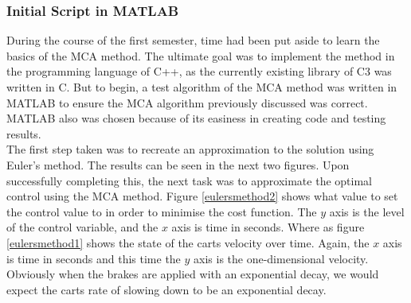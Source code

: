 \documentclass[11pt,draftd]{article}
\begin{document}
\subsubsection{Initial Script in MATLAB}
During the course of the first semester, time had been put aside to learn the basics of the MCA method. The ultimate goal was to implement the method in the programming language of C++, as the currently existing library of C3 was written in C. But to begin, a test algorithm of the MCA method was written in MATLAB to ensure the MCA algorithm previously discussed was correct. MATLAB also was chosen because of its easiness in creating code and testing results. \\

The first step taken was to recreate an approximation to the solution using Euler's method. The results can be seen in the next two figures. Upon successfully completing this, the next task was to approximate the optimal control using the MCA method. Figure \ref{eulersmethod2} shows what value to set the control value to in order to minimise the cost function. The $ y $ axis is the level of the control variable, and the $ x $ axis is time in seconds. Where as figure \ref{eulersmethod1} shows the state of the carts velocity over time. Again, the $ x $ axis is time in seconds and this time the $ y $ axis is the one-dimensional velocity. Obviously when the brakes are applied with an exponential decay, we would expect the carts rate of slowing down to be an exponential decay. 
\end{document}
